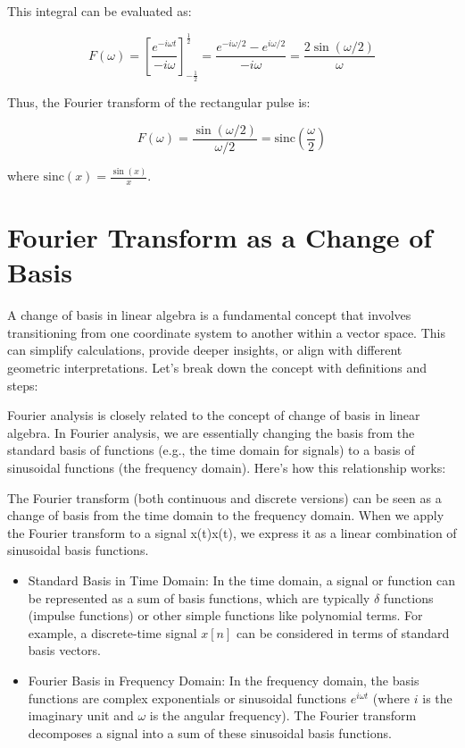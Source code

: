 This integral can be evaluated as:

\[ F(\omega) = \left[ \frac{e^{-i \omega t}}{-i \omega} \right]_{-\frac{1}{2}}^{\frac{1}{2}} = \frac{e^{-i \omega / 2} - e^{i \omega / 2}}{-i \omega} = \frac{2 \sin(\omega / 2)}{\omega} \]

Thus, the Fourier transform of the rectangular pulse is:

\[ F(\omega) = \frac{\sin(\omega / 2)}{\omega / 2} = \text{sinc}\left(\frac{\omega}{2}\right) \]

where \(\text{sinc}(x) = \frac{\sin(x)}{x}\).

\section{Fourier Transform as a Change of Basis}
A change of basis in linear algebra is a fundamental concept that involves transitioning from one coordinate system to another within a vector space. This can simplify calculations, provide deeper insights, or align with different geometric interpretations. Let's break down the concept with definitions and steps:

Fourier analysis is closely related to the concept of change of basis in linear algebra. In Fourier analysis, we are essentially changing the basis from the standard basis of functions (e.g., the time domain for signals) to a basis of sinusoidal functions (\eg the frequency domain). Here’s how this relationship works:

The Fourier transform (both continuous and discrete versions) can be seen as a change of basis from the time domain to the frequency domain. When we apply the Fourier transform to a signal x(t)x(t), we express it as a linear combination of sinusoidal basis functions.

\begin{itemize}
	\item Standard Basis in Time Domain: In the time domain, a signal or function can be represented as a sum of basis functions, which are typically \( \delta \) functions (impulse functions) or other simple functions like polynomial terms. For example, a discrete-time signal \( x[n] \) can be considered in terms of standard basis vectors.

	\item Fourier Basis in Frequency Domain: In the frequency domain, the basis functions are complex exponentials or sinusoidal functions \( e^{i \omega t} \) (where \( i \) is the imaginary unit and \( \omega \) is the angular frequency). The Fourier transform decomposes a signal into a sum of these sinusoidal basis functions.
\end{itemize}

